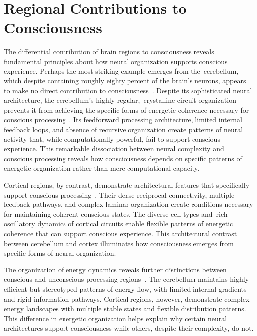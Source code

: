 \section{Regional Contributions to Consciousness}


The differential contribution of brain regions to consciousness reveals fundamental principles about how neural organization supports conscious experience. Perhaps the most striking example emerges from the~cerebellum, which despite containing roughly eighty percent of the brain's neurons, appears to make no direct contribution to consciousness~\cite{Larkum2022}. Despite its sophisticated neural architecture, the cerebellum's highly regular,~crystalline circuit organization prevents it from achieving the specific forms of energetic coherence necessary for conscious processing~\cite{Beniaguev2021}. Its feedforward processing architecture, limited internal feedback loops, and absence of recursive organization create patterns of neural activity that, while computationally powerful, fail to support conscious experience. This remarkable dissociation between neural complexity and conscious processing reveals how consciousness depends on specific patterns of energetic organization rather than mere computational capacity.

Cortical regions, by contrast, demonstrate architectural features that specifically support conscious processing~\cite{Fox2005, pinotsis2023cytoelectric}. Their dense reciprocal connectivity, multiple feedback pathways, and complex laminar organization create conditions necessary for maintaining coherent conscious states. The diverse cell types and~rich oscillatory dynamics of cortical circuits enable flexible patterns of energetic coherence that can support conscious experience. This architectural contrast between cerebellum and cortex illuminates how consciousness emerges from specific forms of neural organization.

The organization of energy dynamics reveals further distinctions between conscious and unconscious processing regions~\cite{Dehaene2006, hunt2024electromagnetic}. The cerebellum maintains highly efficient but stereotyped patterns of energy flow, with limited internal gradients and rigid information pathways. Cortical regions, however, demonstrate complex energy landscapes with multiple stable states and flexible distribution patterns. This difference in energetic organization helps explain why certain neural architectures support consciousness while others, despite their complexity, do not.

